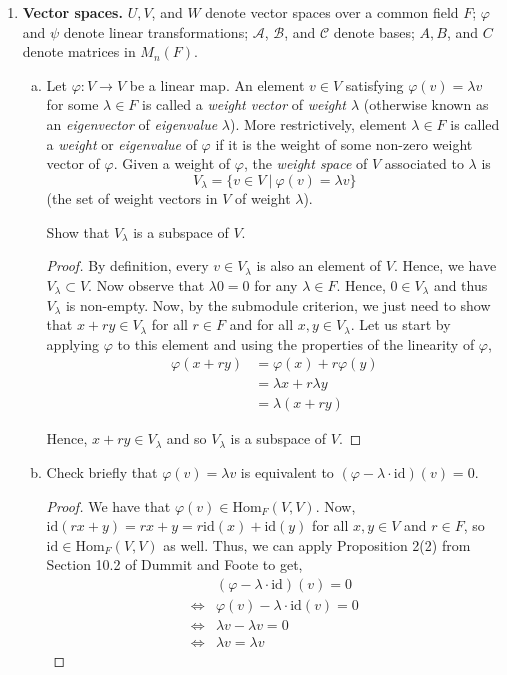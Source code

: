 \documentclass[11pt, reqno]{amsart}
\theoremstyle{plain}
\theoremstyle{definition}
\theoremstyle{example}
\def\cA{\mathcal{A}}\def\cB{\mathcal{B}}\def\cC{\mathcal{C}}\def\cD{\mathcal{D}}\def\cE{\mathcal{E}}\def\cF{\mathcal{F}}\def\cG{\mathcal{G}}\def\cH{\mathcal{H}}\def\cI{\mathcal{I}}\def\cJ{\mathcal{J}}\def\cK{\mathcal{K}}\def\cL{\mathcal{L}}\def\cM{\mathcal{M}}\def\cN{\mathcal{N}}\def\cO{\mathcal{O}}\def\cP{\mathcal{P}}\def\cQ{\mathcal{Q}}\def\cR{\mathcal{R}}\def\cS{\mathcal{S}}\def\cT{\mathcal{T}}\def\cU{\mathcal{U}}\def\cV{\mathcal{V}}\def\cW{\mathcal{W}}\def\cX{\mathcal{X}}\def\cY{\mathcal{Y}}\def\cZ{\mathcal{Z}}
\def\id{\mathrm{id}}
\def\f{\varphi}
\begin{document}
\begin{enumerate}[1.]
\item \textbf{Vector spaces.} $U, V$, and $W$ denote vector spaces over a common field $F$; $\f$ and $\psi$ denote linear transformations; $\cA$, $\cB$, and $\cC$ denote bases; $A, B$, and $C$ denote matrices in $M_n(F)$. 
\begin{enumerate}[(a)]
\item Let $\f:V \to V$ be a linear map. An element $v \in V$ satisfying $\f(v) = \lambda v$ for some $\lambda \in F$ is called a \emph{weight vector} of \emph{weight $\lambda$} (otherwise known as an \emph{eigenvector} of \emph{eigenvalue} $\lambda$). More restrictively, element $\lambda \in F$ is called a \emph{weight} or \emph{eigenvalue} of $\f$ if it is the weight of some non-zero weight vector of $\f$. Given a weight of $\f$, the \emph{weight space} of $V$ associated to $\lambda$ is 
$$V_\lambda = \{ v\in V ~|~ \f(v) = \lambda v\}$$
(the set of weight vectors in $V$ of weight $\lambda$). 

\medskip

Show that $V_\lambda$ is a subspace of $V$. 

\begin{proof}
By definition, every $v \in V_{\lambda}$ is also an element of $V$. Hence, we have $V_{\lambda} \subset V$. Now observe that $\lambda 0 = 0$ for any $\lambda \in F$. Hence, $0 \in V_{\lambda}$ and thus $V_\lambda$ is non-empty. Now, by the submodule criterion, we just need to show that $x + ry \in V_{\lambda}$ for all $r \in F$ and for all $x, y \in V_{\lambda}$. Let us start by applying $\varphi$ to this element and using the properties of the linearity of $\varphi$,
\begin{align*}
\varphi(x + ry) &= \varphi(x) + r\varphi(y)\\
&= \lambda x + r \lambda y\\
&= \lambda (x + ry)
\end{align*}

Hence, $x + ry \in V_{\lambda}$ and so $V_{\lambda}$ is a subspace of $V$.
\end{proof}

\item Check briefly that $\f(v) = \lambda v$ is equivalent to $(\f - \lambda\cdot \id)(v) = 0$. 

\begin{proof}
We have that $\f(v) \in \text{Hom}_{F}(V, V)$. Now, $\id(rx + y) = rx + y = r\id(x) + \id(y)$ for all $x, y \in V$ and $r \in F$, so $\id \in \text{Hom}_{F}(V, V)$ as well. Thus, we can apply Proposition 2(2) from Section 10.2 of Dummit and Foote to get,
\begin{align*}
&(\f - \lambda\cdot \id)(v) = 0\\
\iff &\f(v) - \lambda\cdot \id(v) = 0\\
\iff &\lambda v - \lambda v = 0\\
\iff &\lambda v = \lambda v
\end{align*}
\end{proof}


\end{enumerate}
\end{enumerate}
\end{document}
